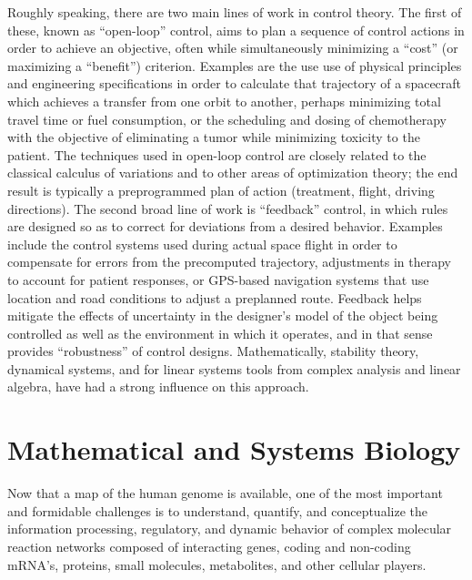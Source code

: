 \documentclass[11pt]{article}
\begin{document}
Roughly speaking, there are two main lines of work in control theory.
The first of these, known as ``open-loop'' control, aims to plan a sequence of
control actions in order to achieve an objective, often while simultaneously
minimizing a ``cost'' (or maximizing a ``benefit'') criterion. 
Examples are the use use of physical principles and engineering specifications
in order to calculate that trajectory of a spacecraft which achieves a
transfer from one orbit to another, perhaps minimizing total travel time or
fuel consumption, or the scheduling and dosing of chemotherapy with the
objective of eliminating a tumor while minimizing toxicity to the patient.
The techniques used in open-loop control are closely related to the classical
calculus of variations and to other areas of optimization theory; the end
result is typically a preprogrammed plan of action (treatment, flight, driving
directions).
The second broad line of work is ``feedback'' control, in which rules are
designed so as to correct for deviations from a desired behavior.
Examples include the control systems used during actual space
flight in order to compensate for errors from the precomputed trajectory,
adjustments in therapy to account for patient responses, or GPS-based
navigation systems that use location and road conditions to adjust a
preplanned route. 
Feedback helps mitigate the effects of uncertainty in the designer's model of
the object being controlled as well as the environment in which it operates,
and in that sense provides ``robustness'' of control designs.
Mathematically, stability theory, dynamical systems, and for linear
systems tools from complex analysis and linear algebra, have had a strong
influence on this approach.


\newpage

\section*{Mathematical and Systems Biology}
Now that a map of the human genome is available, one of the most important and
formidable challenges is 
to understand, quantify, and conceptualize the information processing,
regulatory, and dynamic behavior of complex molecular reaction networks
composed of interacting genes, coding and non-coding mRNA's, proteins, small
molecules, metabolites, and other cellular players.
\end{document}
